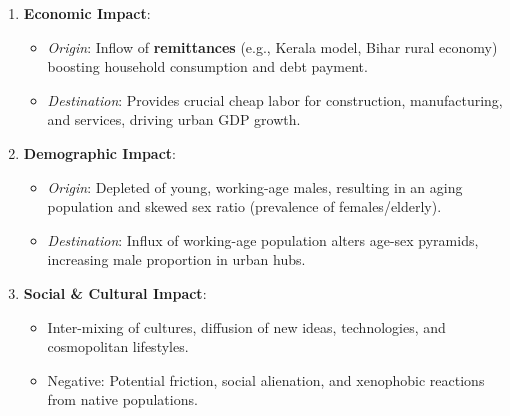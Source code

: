 \documentclass[11pt,a4paper]{article}
\begin{document}
\begin{enumerate}[leftmargin=*]
  \item \textbf{Economic Impact}:
  \begin{itemize}
    \item \textit{Origin}: Inflow of \textbf{remittances} (e.g., Kerala model, Bihar rural economy) boosting household consumption and debt payment.
    \item \textit{Destination}: Provides crucial cheap labor for construction, manufacturing, and services, driving urban GDP growth.
  \end{itemize}

  \item \textbf{Demographic Impact}:
  \begin{itemize}
    \item \textit{Origin}: Depleted of young, working-age males, resulting in an aging population and skewed sex ratio (prevalence of females/elderly).
    \item \textit{Destination}: Influx of working-age population alters age-sex pyramids, increasing male proportion in urban hubs.
  \end{itemize}

  \item \textbf{Social \& Cultural Impact}:
  \begin{itemize}
    \item Inter-mixing of cultures, diffusion of new ideas, technologies, and cosmopolitan lifestyles.
    \item Negative: Potential friction, social alienation, and xenophobic reactions from native populations.
  \end{itemize}
\end{enumerate}
\end{document}
